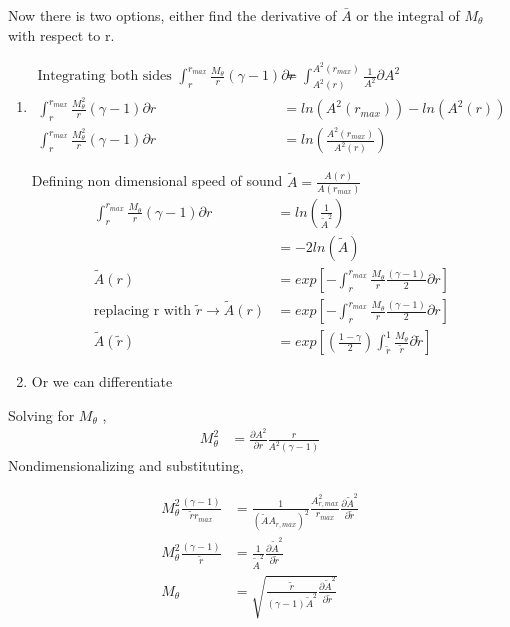 \documentclass[12pt]{article}
\begin{document}
Now there is two options, either find the derivative of  $\bar{A}$ or the integral of
$M_{\theta}$ with respect to r.
\begin{enumerate}
    \item
\begin{align*}
\text{Integrating both sides } \int_{r}^{r_{max}}\frac{M_{\theta}}{r}\left(\gamma - 1\right){\partial r}  &=\int_{A^2(r)}^{A^2(r_{max})}\frac{1}{A^2}  {\partial A^2}\\
\int_{r}^{r_{max}}\frac{M^2_{\theta}}{r}\left(\gamma - 1\right){\partial r}  &=ln(A^2(r_{max})) - ln(A^2(r)) \\
\int_{r}^{r_{max}}\frac{M^2_{\theta}}{r}\left(\gamma - 1\right){\partial r}  &=ln\left(\frac{A^2(r_{max})}{A^2(r)}\right) 
\end{align*}

Defining non dimensional speed of sound $\tilde{A} = \frac{A(r)}{A(r_{max})}$
\begin{align*}
\int_{r}^{r_{max}}\frac{M_{\theta}}{r}\left(\gamma - 1\right){\partial r}  &=ln\left(\frac{1}{\tilde{A}^2}\right) \\
&= -2ln(\tilde{A})\\
\tilde{A}(r) &= exp\left[-\int_{r}^{r_{max}}\frac{M_{\theta}}{r}\frac{\left(\gamma - 1\right)}{2}{\partial r}\right] \\ \text{replacing r with }\tilde{r} \rightarrow \tilde{A}(r) &= exp\left[-\int_{r}^{r_{max}}\frac{M_{\theta}}{r}\frac{\left(\gamma - 1\right)}{2}{\partial r}\right]		\\
\tilde{A}(\tilde{r}) &= exp\left[\left(\frac{1 - \gamma}{2}\right)\int_{\tilde{r}}^{1}\frac{M_{\theta}}{\tilde{r}}{\partial \tilde{r}}\right]	
\end{align*}
\item Or we can differentiate
\end{enumerate}
Solving for $M_{\theta}$ ,
\begin{align*}
M_{\theta}^2 
&= \frac{\partial A^2}{\partial r} \frac{r}{A^2 \left(\gamma - 1\right)}
\end{align*}
Nondimensionalizing and substituting, 

\begin{align} 
    M_{\theta}^2
    \frac{\left( \gamma - 1 \right)}{\widetilde{r} r_{max}} &=
    \frac{1}{(\widetilde{A}A_{r,max})^2}\frac{A_{r,max}^2}{r_{max}}
    \frac{\partial \widetilde{A}^2}{\partial \widetilde{r}} \nonumber \\
    M_{\theta}^2     \frac{\left( \gamma - 1 \right)}{\widetilde{r} } &=
    \frac{1}{\widetilde{A}^2}
    \frac{\partial \widetilde{A}^2}{\partial \widetilde{r}} \nonumber \\
    M_{\theta} &= \sqrt{\frac{\widetilde{r}}{(\gamma-1) \widetilde{A}^2}
        \frac{\partial\widetilde{A}^2}{\partial \widetilde{r} }
    } \label{eq:Mthetabackcalculated}
\end{align}
\end{document}
